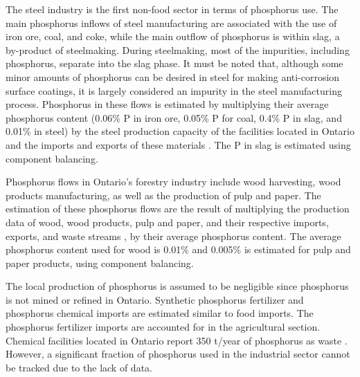 \documentclass[authoryear]{elsarticle}
\begin{document}
The steel industry is the first non-food sector in terms of phosphorus use. The main phosphorus inflows of steel manufacturing are associated with the use of iron ore, coal, and coke, while the
main outflow of phosphorus is within slag, a by-product of steelmaking. During steelmaking, most of the impurities, including phosphorus, separate into the slag phase.
It must be noted that, although some minor amounts of phosphorus can be desired in steel for making anti-corrosion surface coatings, it is largely considered an impurity in the steel manufacturing process. Phosphorus in these flows is estimated by multiplying their average phosphorus content (0.06\% P in iron ore, 0.05\% P for coal, 0.4\% P in slag, and 0.01\% in steel) \citep{yokoyama2007separation} by the steel production capacity of the facilities located in Ontario \citep{CheminfoServices, AlgomaSteel, Stelco, PFlows_Ontario} and the imports and exports of these materials \citep{WorldIntegratedTradeSolution, InterprovincialImportsExports}. The P in slag is estimated using component balancing.

Phosphorus flows in Ontario's forestry industry include wood harvesting, wood products manufacturing, as well as the production of pulp and paper. The estimation of these phosphorus flows are the result of multiplying the production data of wood, wood products, pulp and paper, and their respective imports, exports, and waste streams \citep{CanadianForestServiceStatistics, InterprovincialImportsExports}, by their average phosphorus content.
The average phosphorus content used for wood is 0.01\% \citep{sardans2013tree} and 0.005\% is estimated for pulp and paper products, using component balancing.

The local production of phosphorus is assumed to be negligible since phosphorus is not mined or refined in Ontario. Synthetic phosphorus fertilizer and phosphorus chemical imports are estimated similar to food imports.  The phosphorus fertilizer imports are accounted for in the agricultural section. Chemical facilities located in Ontario report 350 t/year of phosphorus as waste \citep{PFlows_Ontario}.
However,
a significant fraction of phosphorus used in the industrial sector cannot be tracked due to the lack of data.
\end{document}

